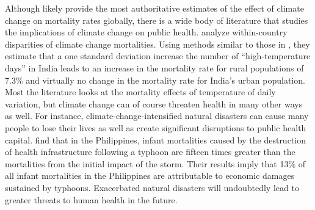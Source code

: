 Although \cite{carleton2022valuing} likely provide the most authoritative estimates of the effect of climate change on mortality rates globally, there is a wide body of literature that studies the implications of climate change on public health. \cite{deschenes2011climate} analyze within-country disparities of climate change mortalities. Using methods similar to those in \cite{carleton2022valuing}, they estimate that a one standard deviation increase the number of ``high-temperature days'' in India leads to an increase in the mortality rate for rural populations of 7.3\% and virtually no change in the mortality rate for India's urban population. Most the literature looks at the mortality effects of temperature of daily variation, but climate change can of course threaten health in many other ways as well. For instance, climate-change-intensified natural disasters can cause many people to lose their lives as well as create significant disruptions to public health capital. \cite{anttila2013destruction} find that in the Philippines, infant mortalities caused by the destruction of health infrastructure following a typhoon are fifteen times greater than the mortalities from the initial impact of the storm. Their results imply that 13\% of all infant mortalities in the Philippines are attributable to economic damages sustained by typhoons. Exacerbated natural disasters will undoubtedly lead to greater threats to human health in the future.


